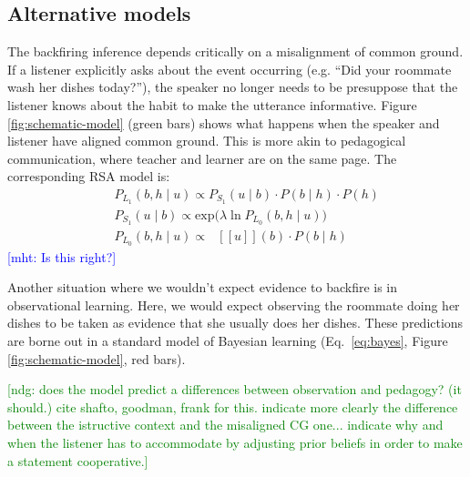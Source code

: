 \documentclass[10pt,letterpaper]{article}
\newcommand{\denote}[1]{\mbox{ $[\![ #1 ]\!]$}}
\newcommand{\ndg}[1]{\textcolor{Green}{[ndg: #1]}}
\newcommand{\mht}[1]{\textcolor{Blue}{[mht: #1]}}
\begin{document}
\subsection{Alternative models}

The backfiring inference depends critically on a misalignment of common ground. 
If a listener explicitly asks about the event occurring (e.g. ``Did your roommate wash her dishes today?''), the speaker no longer needs to be presuppose that the listener knows about the habit to make the utterance informative. 
Figure \ref{fig:schematic-model} (green bars) shows what happens when the speaker and listener have aligned common ground.
This is more akin to pedagogical communication, where teacher and learner are on the same page. 
The corresponding RSA model is:
\begin{eqnarray}
&&P_{L_1}(b, h \mid u)\propto P_{S_1}(u \mid b)\cdot P(b \mid h) \cdot P(h) \label{eq:L1mod}\\
&&P_{S_1}(u \mid b) \propto \mathrm{exp}({\lambda \ln P_{L_0}(b, h \mid u))} \label{eq:S1mod}\\
&&P_{L_0}(b, h \mid u)\propto \denote{u}(b) \cdot P(b \mid h) \label{eq:L0mod}
\end{eqnarray}
\mht{Is this right?}

Another situation where we wouldn't expect evidence to backfire is in observational learning.
Here, we would expect observing the roommate doing her dishes to be taken as evidence that she usually does her dishes. 
These predictions are borne out in a standard model of Bayesian learning (Eq.~\ref{eq:bayes}, Figure \ref{fig:schematic-model}, red bars).

\ndg{does the model predict a differences between observation and pedagogy? (it should.) cite shafto, goodman, frank for this. indicate more clearly the difference between the istructive context and the misaligned CG one... indicate why and when the listener has to accommodate by adjusting prior beliefs in order to make a statement cooperative.}

\end{document}
